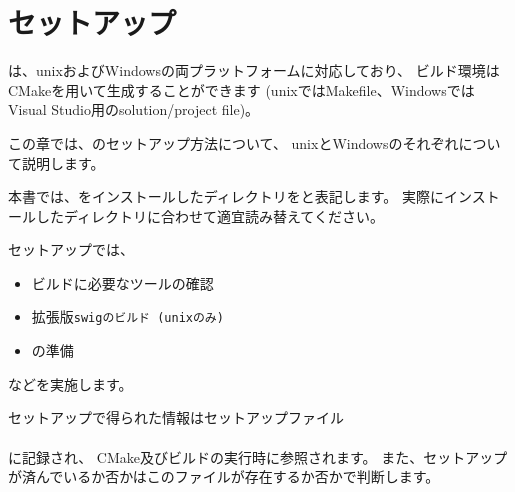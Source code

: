 \newpage
\section{セットアップ}
\label{chap:Setup}
\parindent=0pt

\SprLib は、unixおよびWindowsの両プラットフォームに対応しており、
ビルド環境はCMakeを用いて生成することができます
(unixではMakefile、WindowsではVisual Studio用のsolution/project file)。

この章では、\SprLib のセットアップ方法について、
unixとWindowsのそれぞれについて説明します。


\bigskip
本書では、\SprLib をインストールしたディレクトリを\SprTop{}と表記します。
実際にインストールしたディレクトリに合わせて適宜読み替えてください。

\bigskip
セットアップでは、
\begin{itemize}
  \item	ビルドに必要なツールの確認
  \item	拡張版\tt{swig}のビルド (unixのみ)
  \item	{}の準備
\end{itemize}
などを実施します。

セットアップで得られた情報はセットアップファイル\\
\hspace{10pt}\SetupPath\\
に記録され、
CMake及びビルドの実行時に参照されます。
また、セットアップが済んでいるか否かはこのファイルが存在するか否かで判断します。

